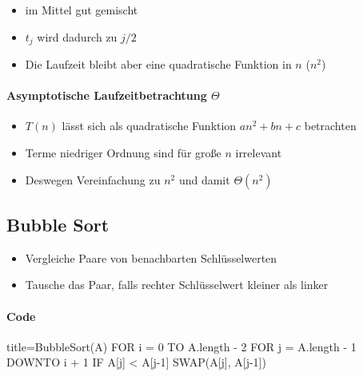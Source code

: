 \documentclass[
    ngerman,
    color=3b,
    dark_mode,
    load_common, %
    summary,
    boxarc,
]{tuda_summary}
\begin{document}
\begin{description}[itemsep=1em]
    \item [\texttt{Average Case}]
          \begin{itemize}
              \item im Mittel gut gemischt
              \item $t_j$ wird dadurch zu $j/2$
              \item Die Laufzeit bleibt aber eine quadratische Funktion in $n$ ($n^2$)
          \end{itemize}
\end{description}

\paragraph{Asymptotische Laufzeitbetrachtung $\Theta$} {\label{insSortLaufzeitTheta}}
\begin{itemize}
    \item $T(n)$ lässt sich als quadratische Funktion $an^2 + bn + c$ betrachten
    \item Terme niedriger Ordnung sind für gro\ss e $n$ irrelevant
    \item Deswegen Vereinfachung zu $n^2$ und damit $\Theta(n^2)$
\end{itemize}
\clearpage
\subsection{Bubble Sort}\label{BubbleSort}
\begin{idea}\mbox{}
    \begin{itemize}
        \item Vergleiche Paare von benachbarten Schlüsselwerten
        \item Tausche das Paar, falls rechter Schlüsselwert kleiner als linker
    \end{itemize}
\end{idea}

\paragraph{Code}\mbox{}
\begin{codeBlock}[autogobble]{title=BubbleSort(A)}
    FOR i = 0 TO A.length - 2
        FOR j = A.length - 1 DOWNTO i + 1
            IF A[j] < A[j-1]
                SWAP(A[j], A[j-1])
\end{codeBlock}
\end{document}
